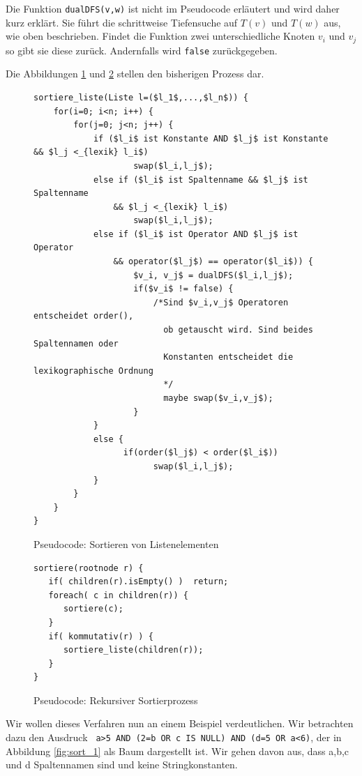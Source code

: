 Die Funktion \verb|dualDFS(v,w)| ist nicht im Pseudocode erläutert und wird daher kurz erklärt. Sie führt die schrittweise Tiefensuche auf $T(v)$ und $T(w)$ aus, wie oben beschrieben. Findet die Funktion zwei unterschiedliche Knoten $v_i$ und $v_j$ so gibt sie diese zurück. Andernfalls wird \verb|false| zurückgegeben.

Die Abbildungen \ref{fig:pesudocode1} und \ref{fig:pesudocode2} stellen den bisherigen Prozess dar.

\begin{figure}[h]

\begin{lstlisting}[mathescape]
sortiere_liste(Liste l=($l_1$,...,$l_n$)) {
	for(i=0; i<n; i++) {
		for(j=0; j<n; j++) {
			if ($l_i$ ist Konstante AND $l_j$ ist Konstante && $l_j <_{lexik} l_i$)
					swap($l_i,l_j$);
			else if ($l_i$ ist Spaltenname && $l_j$ ist Spaltenname
				&& $l_j <_{lexik} l_i$)
					swap($l_i,l_j$);
			else if ($l_i$ ist Operator AND $l_j$ ist Operator
				&& operator($l_j$) == operator($l_i$)) {
					$v_i, v_j$ = dualDFS($l_i,l_j$);
					if($v_i$ != false) {
						/*Sind $v_i,v_j$ Operatoren  entscheidet order(), 
						  ob getauscht wird. Sind beides Spaltennamen oder 
						  Konstanten entscheidet die lexikographische Ordnung 
						  */
						  maybe swap($v_i,v_j$);
					}
			} 
			else {
				  if(order($l_j$) < order($l_i$)) 
				  		swap($l_i,l_j$);
			}
		}
	}
}\end{lstlisting}			
\caption{Pseudocode: Sortieren von Listenelementen}
\label{fig:pesudocode1}
\end{figure}

\begin{figure}[h]
\begin{lstlisting}[mathescape]
sortiere(rootnode r) {
   if( children(r).isEmpty() )  return;        
   foreach( c in children(r)) {
      sortiere(c);
   }           
   if( kommutativ(r) ) {
      sortiere_liste(children(r));
   }
}
\end{lstlisting}
\caption{Pseudocode: Rekursiver Sortierprozess}
\label{fig:pesudocode2}
\end{figure}

Wir wollen dieses Verfahren nun an einem Beispiel verdeutlichen. Wir betrachten dazu den Ausdruck \verb| a>5 AND (2=b OR c IS NULL) AND (d=5 OR a<6)|, der in Abbildung \ref{fig:sort_1} als Baum dargestellt ist. Wir gehen davon aus, dass a,b,c und d Spaltennamen sind und keine Stringkonstanten.

